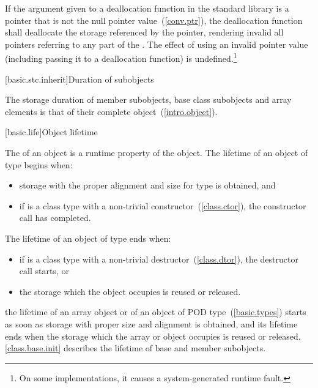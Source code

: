 \pnum
If the argument given to a deallocation function in the standard library
is a pointer that is not the null pointer value~(\ref{conv.ptr}), the
deallocation function shall deallocate the storage referenced by the
pointer, rendering invalid all pointers referring to any part of the
.
%
The effect of using an invalid pointer value (including
passing it to a deallocation function) is undefined.\footnote{On some
implementations, it causes a system-generated runtime
fault.}

[basic.stc.inherit]{Duration of subobjects}

\pnum
{}%
The storage duration of member subobjects, base class subobjects and
array elements is that of their complete object~(\ref{intro.object}).
%

[basic.life]{Object lifetime}

\pnum
{}%
The  of an object is a runtime property of the
object. The lifetime of an object of type  begins when:

\begin{itemize}
\item storage with the proper alignment and size for type  is
obtained, and

\item if  is a class type with a non-trivial
constructor~(\ref{class.ctor}), the constructor call has completed.
\end{itemize}

The lifetime of an object of type  ends when:

\begin{itemize}
\item if  is a class type with a non-trivial
destructor~(\ref{class.dtor}), the destructor call starts, or

\item the storage which the object occupies is reused or released.
\end{itemize}

\pnum
\enternote the lifetime of an array object or of an object of POD
type~(\ref{basic.types}) starts as soon as storage with proper size and
alignment is obtained, and its lifetime ends when the storage which the
array or object occupies is reused or released. \ref{class.base.init}
describes the lifetime of base and member subobjects. \exitnote

